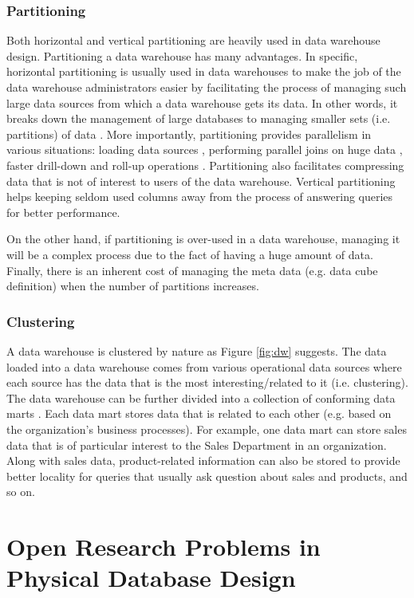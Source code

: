 \documentclass[12pt,a4paper]{article}
\begin{document}
\subsubsection{Partitioning}
Both horizontal and vertical partitioning are heavily used in data warehouse design. Partitioning a data warehouse has many advantages. In specific, horizontal
partitioning
is usually used in data warehouses to make the job of the data warehouse administrators easier by facilitating the process of managing such large data
sources from which a data warehouse gets its data. In other words, it breaks down the management of large databases to managing smaller sets (i.e. partitions)
of data \cite{thusoo2010data}. More importantly, partitioning provides parallelism in various situations: loading data sources \cite{barclay1994loading},
performing parallel joins on huge data \cite{datta2002parallel}, faster drill-down and roll-up operations \cite{chaudhuri1997overview}. Partitioning also
facilitates compressing data that is not of interest to users of the data warehouse. Vertical partitioning helps keeping seldom used columns away from
the process of answering queries for better performance.

On the other hand, if partitioning is over-used in a data warehouse, managing it will be a complex process due to the fact of having a huge amount of
data.
Finally, there is an inherent cost of managing the meta data (e.g. data cube definition) when the number of partitions increases.

\subsubsection{Clustering}
A data warehouse is clustered by nature as Figure \ref{fig:dw} suggests. The data loaded into a data warehouse comes from various operational data sources where
each source has the data that is the most interesting/related to it (i.e. clustering). The data warehouse can be further divided into a collection of
conforming data marts \cite{sen2005comparison}. Each data mart stores data that is related to each other (e.g. based on the organization's business processes).
For example, one data mart can store sales data that is of particular interest to the Sales Department in an organization. Along with sales data,
product-related information can also be stored to provide better locality for queries that usually ask question about sales and products, and so on.

\section{Open Research Problems in Physical Database Design}
\label{SEC-OPEN}
\end{document}
